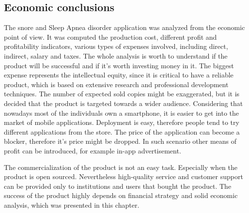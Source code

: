 \subsection{Economic conclusions}
The snore and Sleep Apnea disorder application was analyzed from the economic point of view. It was computed the production cost, different profit and profitability indicators, various types of expenses involved, including direct, indirect, salary and taxes. The whole analysis is worth to understand if the product will be successful and if it's worth investing money in it. The biggest expense represents the intellectual equity, since it is critical to have a reliable product, which is based on extensive research and professional development techniques. The number of expected sold copies might be exaggerated, but it is decided that the product is targeted towards a wider audience. Considering that nowadays most of the individuals own a smartphone, it is easier to get into the market of mobile applications. Deployment is easy, therefore people tend to try different applications from the store. The price of the application can become a blocker, therefore it's price might be dropped. In such scenario other means 
of profit can be introduced, for example in-app advertisement. 

The commercialization of the product is not an easy task. Especially when the product is open sourced. Nevertheless high-quality service and customer support can be provided only to institutions and users that bought the product. The success of the product highly depends on financial strategy and solid economic analysis, which was presented in this chapter.

\clearpage